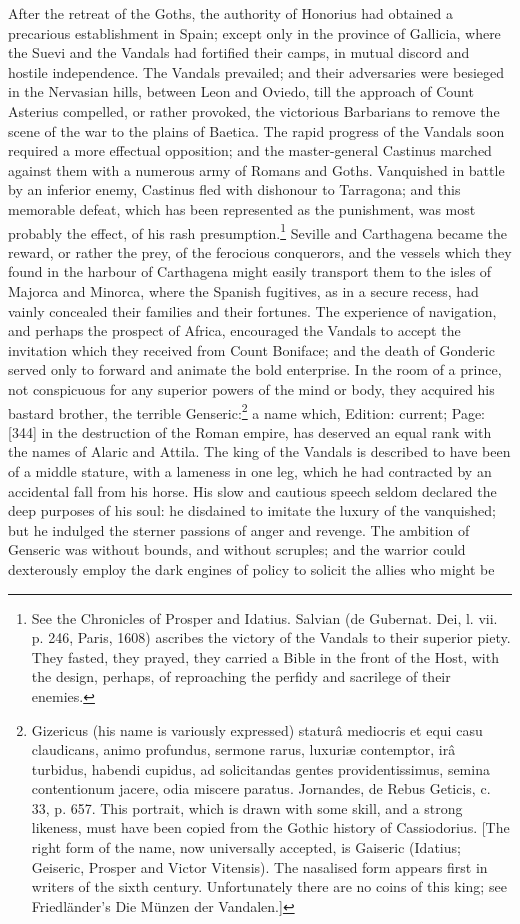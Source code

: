 After the retreat of the Goths, the authority of Honorius had obtained a precarious establishment in Spain; except only in the province of Gallicia, where the Suevi and the Vandals had fortified their camps, in mutual discord and hostile independence. The Vandals prevailed; and their adversaries were besieged in the Nervasian hills, between Leon and Oviedo, till the approach of Count Asterius compelled, or rather provoked, the victorious Barbarians to remove the scene of the war to the plains of Baetica. The rapid progress of the Vandals soon required a more effectual opposition; and the master-general Castinus marched against them with a numerous army of Romans and Goths. Vanquished in battle by an inferior enemy, Castinus fled with dishonour to Tarragona; and this memorable defeat, which has been represented as the punishment, was most probably the effect, of his rash presumption.\footnote{See the Chronicles of Prosper and Idatius. Salvian (de Gubernat. Dei, l. vii. p. 246, Paris, 1608) ascribes the victory of the Vandals to their superior piety. They fasted, they prayed, they carried a Bible in the front of the Host, with the design, perhaps, of reproaching the perfidy and sacrilege of their enemies.} Seville and Carthagena became the reward, or rather the prey, of the ferocious conquerors, and the vessels which they found in the harbour of Carthagena might easily transport them to the isles of Majorca and Minorca, where the Spanish fugitives, as in a secure recess, had vainly concealed their families and their fortunes. The experience of navigation, and perhaps the prospect of Africa, encouraged the Vandals to accept the invitation which they received from Count Boniface; and the death of Gonderic served only to forward and animate the bold enterprise. In the room of a prince, not conspicuous for any superior powers of the mind or body, they acquired his bastard brother, the terrible Genseric:\footnote{Gizericus (his name is variously expressed) staturâ mediocris et equi casu claudicans, animo profundus, sermone rarus, luxuriæ contemptor, irâ turbidus, habendi cupidus, ad solicitandas gentes providentissimus, semina contentionum jacere, odia miscere paratus. Jornandes, de Rebus Geticis, c. 33, p. 657. This portrait, which is drawn with some skill, and a strong likeness, must have been copied from the Gothic history of Cassiodorius. [The right form of the name, now universally accepted, is Gaiseric (Idatius; Geiseric, Prosper and Victor Vitensis). The nasalised form appears first in writers of the sixth century. Unfortunately there are no coins of this king; see Friedländer\texthebrew{}’s Die Münzen der Vandalen.]} a name which, Edition: current; Page: [344] in the destruction of the Roman empire, has deserved an equal rank with the names of Alaric and Attila. The king of the Vandals is described to have been of a middle stature, with a lameness in one leg, which he had contracted by an accidental fall from his horse. His slow and cautious speech seldom declared the deep purposes of his soul: he disdained to imitate the luxury of the vanquished; but he indulged the sterner passions of anger and revenge. The ambition of Genseric was without bounds, and without scruples; and the warrior could dexterously employ the dark engines of policy to solicit the allies who might be 